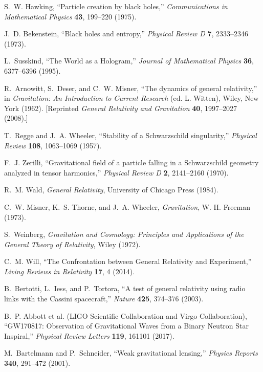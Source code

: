 \documentclass[12pt,a4paper]{article}
\begin{document}
\begin{thebibliography}{99}

S.~W. Hawking,
``Particle creation by black holes,''
\emph{Communications in Mathematical Physics} \textbf{43}, 199--220 (1975).

J.~D. Bekenstein,
``Black holes and entropy,''
\emph{Physical Review D} \textbf{7}, 2333--2346 (1973).

L.~Susskind,
``The World as a Hologram,''
\emph{Journal of Mathematical Physics} \textbf{36}, 6377--6396 (1995).

R.~Arnowitt, S.~Deser, and C.~W. Misner,
``The dynamics of general relativity,''
in \emph{Gravitation: An Introduction to Current Research} (ed. L. Witten),
Wiley, New York (1962). [Reprinted \emph{General Relativity and Gravitation} \textbf{40}, 1997--2027 (2008).]

T.~Regge and J.~A. Wheeler,
``Stability of a Schwarzschild singularity,''
\emph{Physical Review} \textbf{108}, 1063--1069 (1957).

F.~J. Zerilli,
``Gravitational field of a particle falling in a Schwarzschild geometry analyzed in tensor harmonics,''
\emph{Physical Review D} \textbf{2}, 2141--2160 (1970).

R.~M. Wald,
\emph{General Relativity},
University of Chicago Press (1984).

C.~W. Misner, K.~S. Thorne, and J.~A. Wheeler,
\emph{Gravitation},
W. H. Freeman (1973).

S.~Weinberg,
\emph{Gravitation and Cosmology: Principles and Applications of the General Theory of Relativity},
Wiley (1972).

C.~M. Will,
``The Confrontation between General Relativity and Experiment,''
\emph{Living Reviews in Relativity} \textbf{17}, 4 (2014).

B.~Bertotti, L.~Iess, and P.~Tortora,
``A test of general relativity using radio links with the Cassini spacecraft,''
\emph{Nature} \textbf{425}, 374--376 (2003).

B.~P. Abbott et al. (LIGO Scientific Collaboration and Virgo Collaboration),
``GW170817: Observation of Gravitational Waves from a Binary Neutron Star Inspiral,''
\emph{Physical Review Letters} \textbf{119}, 161101 (2017).

M.~Bartelmann and P.~Schneider,
``Weak gravitational lensing,''
\emph{Physics Reports} \textbf{340}, 291--472 (2001).


\end{thebibliography}
\end{document}
